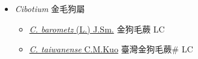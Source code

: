 
  \begin{itemize}
 \item[] \textit{Cibotium} 金毛狗屬
                    
  \begin{itemize}
        \item[] \href{http://www.theplantlist.org/tpl1.1/search?q=Cibotium+barometz}{\textit{C. barometz} (L.) J.Sm.}   金狗毛蕨 LC
        \item[] \href{http://www.theplantlist.org/tpl1.1/search?q=Cibotium+taiwanense}{\textit{C. taiwanense} C.M.Kuo}   臺灣金狗毛蕨\# LC
  \end{itemize}
  \end{itemize}
